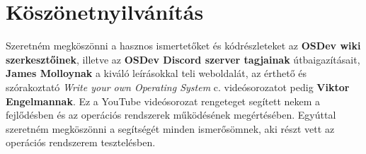 \documentclass[12pt,numbers=noenddot]{report}
\begin{document}

\chapter*{Köszönetnyilvánítás}

Szeretném megköszönni a hasznos ismertetőket és kódrészleteket az
\textbf{OSDev wiki szerkesztőinek}, illetve az \textbf{OSDev Discord
szerver tagjainak} útbaigazításait, \textbf{James Molloynak} a kiváló
leírásokkal teli weboldalát, az érthető és szórakoztató
\textit{Write your own Operating System} c. videósorozatot pedig
\textbf{Viktor Engelmannak}. Ez a YouTube videósorozat rengeteget segített nekem
a fejlődésben és az operációs rendszerek működésének megértésében. Egyúttal
szeretném megköszönni a segítségét minden ismerősömnek, aki részt vett az
operációs rendszerem tesztelésben.
\end{document}
